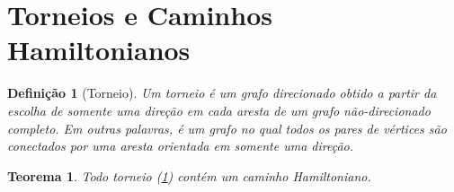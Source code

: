 \documentclass[11pt]{article}
\newtheorem{theorem}{Teorema}
\newtheorem{definition}{Definição}[section]
\begin{document}
    \section{Torneios e Caminhos Hamiltonianos}

    \begin{definition}[Torneio]\label{def:torneio}
        Um torneio é um grafo direcionado obtido a partir da escolha de somente uma direção em cada aresta de um grafo não-direcionado completo. Em outras palavras,  é um grafo no qual todos os pares de vértices são conectados por uma aresta orientada em somente uma direção.
    \end{definition}

    \begin{theorem}\label{thm:1}
        Todo torneio (\cref{def:torneio}) contém um caminho Hamiltoniano.
    \end{theorem}
\end{document}
